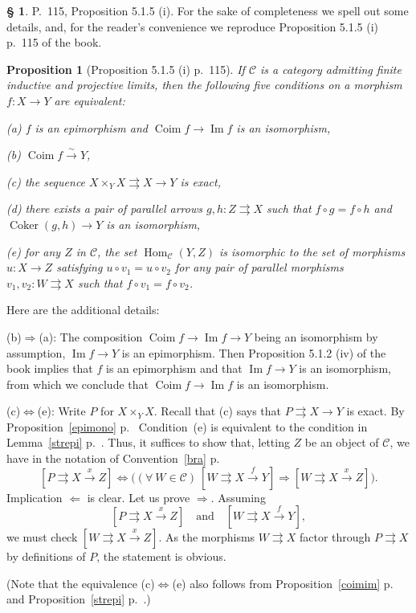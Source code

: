 \documentclass[12pt]{article}
\newtheorem{prop}[thm]{Proposition}
\theoremstyle{remark}
\theoremstyle{definition}
\newtheorem{s}[thm]{\S}
\newcommand{\nn}{\noindent}
\newcommand{\C}{\mathcal C}
\newcommand{\parar}{\rightrightarrows}
\newcommand{\si}{\Leftarrow}
\newcommand{\ssi}{\Leftrightarrow}
\newcommand{\then}{\Rightarrow}
\newcommand{\xr}{\xrightarrow}
\DeclareMathOperator{\Coim}{Coim}
\DeclareMathOperator{\Coker}{Coker}
\DeclareMathOperator{\Ima}{Im}
\DeclareMathOperator{\Hom}{Hom}
\begin{document}
\begin{s}\label{515i}
P.~115, Proposition 5.1.5 (i). For the sake of completeness we spell out some details, and, for the reader's convenience we reproduce Proposition 5.1.5 (i) p.~115 of the book. 

\begin{prop}[Proposition 5.1.5 (i) p.~115] 
If $\C$ is a category admitting finite inductive and projective limits, then the following five conditions on a morphism $f:X\to Y$ are equivalent:

\nn\emph{(a)} $f$ is an epimorphism and $\Coim f\to\Ima f$ is an isomorphism,

\nn\emph{(b)} $\Coim f\xr\sim Y$,

\nn\emph{(c)} the sequence $X\times_YX\parar X\to Y$ is exact,

\nn\emph{(d)} there exists a pair of parallel arrows $g,h:Z\parar X$ such that $f\circ g=f\circ h$ and $\Coker(g,h)\to Y$ is an isomorphism,

\nn\emph{(e)} for any $Z$ in $\C$, the set $\Hom_\C(Y,Z)$ is isomorphic to the set of morphisms $u:X\to Z$ satisfying $u\circ v_1=u\circ v_2$ for any pair of parallel morphisms $v_1,v_2:W\parar X$ such that $f\circ v_1=f\circ v_2$. 
\end{prop} 

Here are the additional details: 

\nn(b)$\then$(a): The composition $\Coim f\to\Ima f\to Y$ being an isomorphism by assumption, $\Ima f\to Y$ is an epimorphism. Then Proposition 5.1.2 (iv) of the book implies that $f$ is an epimorphism and that $\Ima f\to Y$ is an isomorphism, from which we conclude that $\Coim f\to\Ima f$ is an isomorphism.

\nn(c)$\ssi$(e): Write $P$ for $X\times_YX$. Recall that (c) says that $P\parar X\to Y$ is exact. By Proposition~\ref{epimono} p.~\pageref{epimono} Condition~(e) is equivalent to the condition in Lemma~\ref{strepi} p.~\pageref{strepi}. Thus, it suffices to show that, letting $Z$ be an object of $\C$, we have in the notation of Convention~\ref{bra} p.~\pageref{bra} 
$$
[P\parar X\xr xZ]\iff\Big((\forall\ W\in\C)\ [W\parar X\xr fY]\then[W\parar X\xr xZ]\Big).
$$ 
Implication $\si$ is clear. Let us prove $\then$. Assuming 
$$
[P\parar X\xr xZ]\quad\text{and}\quad[W\parar X\xr fY],
$$ 
we must check $[W\parar X\xr xZ]$. As the morphisms $W\parar X$ factor through $P\parar X$ by definitions of $P$, the statement is obvious. 

(Note that the equivalence (c)$\ssi$(e) also follows from Proposition~\ref{coimim} p.~\pageref{coimim} and Proposition~\ref{strepi} p.~\pageref{strepi}.)
\end{s}
\end{document}

